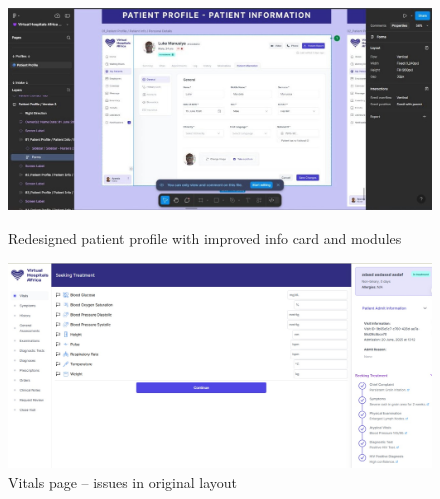 \begin{figure}[H]
    \centering
    \begin{minipage}{0.47\textwidth}
        \centering
        \includegraphics[width=\textwidth]{images/(VHA)-5.jpg}
        \caption{Redesigned patient profile with improved info card and modules}
        \label{fig:desbign-5}
    \end{minipage}\hfill
    \begin{minipage}{0.47\textwidth}
        \centering
        \includegraphics[width=\textwidth]{images/(VHA)-6.jpg}
        \caption{Vitals page – issues in original layout}
        \label{fig:design-6}
    \end{minipage}
\end{figure}
